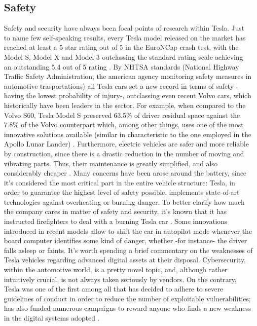 \subsection{Safety}

Safety and security have always been focal points of research within Tesla. Just to name few self-speaking results, every Tesla model released on the market has reached at least a 5 star rating out of 5 in the EuroNCap crash test, with the Model S, Model X and Model 3 outclassing the standard rating scale achieving an outstanding 5.4 out of 5 rating \cite{tesla_euroncap}.
By NHTSA standards (National Highway Traffic Safety Administration, the american agency monitoring safety measures in automotive trasportations) all Tesla cars set a new record in terms of safety -having the lowest probability of injury-, outclassing even recent Volvo cars, which historically have been leaders in the sector. For example, when compared to the Volvo S60, Tesla Model S preserved 63.5\% of driver residual space against the 7.8\% of the Volvo counterpart which, among other things, uses one of the most innovative solutions available (similar in characteristic to the one employed in the Apollo Lunar Lander) \cite{}.
Furthermore, electric vehicles are safer and more reliable by construction, since there is a drastic reduction in the number of moving and vibrating parts. Thus, their maintenance is greatly simplified, and also considerably cheaper \cite{}. Many concerns have been arose around the battery, since it's considered the most critical part in the entire vehicle structure: Tesla, in order to guarantee the highest level of safety possible, implements state-of-art technologies against overheating or burning danger. To better clarify how much the company cares in matter of safety and security, it's known that it has instructed firefighters to deal with a burning Tesla car \cite{}. Some innovations introduced in recent models allow to shift the car in autopilot mode whenever the board computer identifies some kind of danger, whether -for instance- the driver falls asleep or faints.
It's worth spending a brief commentary on the weaknesses of Tesla vehicles regarding advanced digital assets at their disposal. Cybersecurity, within the automotive world, is a pretty novel topic, and, although rather intuitively crucial, is not always taken seriously by vendors. On the contrary, Tesla was one of the first among all that has decided to adhere to severe guidelines of conduct in order to reduce the number of exploitable vulnerabilities; has also funded numerous campaigns to reward anyone who finds a new weakness in the digital systems adopted \cite{tesla_security_methods}.

